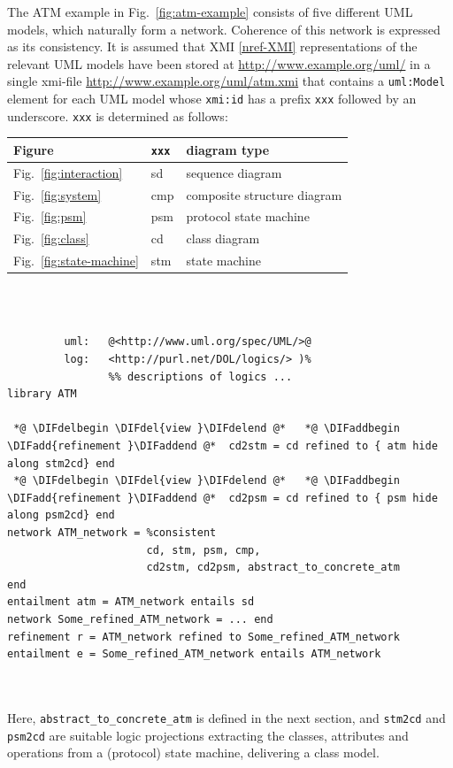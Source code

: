 \documentclass[10pt, a4paper]{isov2}
\newcommand{\bcnew}[1]{~\\{\color{red}\large \hrulefill \href{http://issues.omg.org/browse/DOL-#1}{\normalfont{JIRA DOL-{}#1}} \hrulefill\\}  }
\newcommand{\ecnew}[0]{~\\{{\color{red}\large \hrulefill {\normalfont{end}} \hrulefill\\}  }}
\renewcommand{\noterefname}{note}
\renewcommand{\nref}[1]{\noterefname~\ref{#1}}
\renewcommand{\nref}[1]{\ref{nref-#1}}
\providecommand{\DIFaddtex}[1]{{\protect\color{blue}\uwave{#1}}} %
\providecommand{\DIFdeltex}[1]{{\protect\color{red}\sout{#1}}}                      %
\providecommand{\DIFaddbegin}{} %
\providecommand{\DIFaddend}{} %
\providecommand{\DIFdelbegin}{} %
\providecommand{\DIFdelend}{} %
\providecommand{\DIFadd}[1]{\texorpdfstring{\DIFaddtex{#1}}{#1}} %
\providecommand{\DIFdel}[1]{\texorpdfstring{\DIFdeltex{#1}}{}} %
\begin{document}
The ATM example in Fig.~\ref{fig:atm-example} consists of five different
UML models, which naturally form a network. Coherence of this network is
expressed as its consistency.  It is assumed that XMI \nref{XMI} representations of
the relevant UML models have been stored at
\url{http://www.example.org/uml/} in a single xmi-file \url{http://www.example.org/uml/atm.xmi} that contains a
\texttt{uml:Model} element for each UML model whose \texttt{xmi:id} has
a prefix \texttt{xxx} followed by an underscore. \texttt{xxx} is determined 
as follows:\medskip

\begin{tabular}{|l|l|l|}\hline
\textbf{Figure} & \textbf{\texttt{xxx}} & \textbf{diagram type}\\\hline
Fig.~\ref{fig:interaction} & sd & sequence diagram\\\hline
Fig.~\ref{fig:system} & cmp & composite structure diagram\\\hline
Fig.~\ref{fig:psm} & psm & protocol state machine\\\hline
Fig.~\ref{fig:class} & cd & class diagram\\\hline
Fig.~\ref{fig:state-machine} & stm & state machine\\\hline
\end{tabular}

\bcnew{41}
\begin{lstlisting}[basicstyle=\ttfamily,language=dolText,escapechar=@,mathescape]
%prefix( :      <http://www.example.org/uml/>
         uml:   @<http://www.uml.org/spec/UML/>@
         log:   <http://purl.net/DOL/logics/> )%
                %% descriptions of logics ...
library ATM

 *@ \DIFdelbegin \DIFdel{view }\DIFdelend @*   *@ \DIFaddbegin \DIFadd{refinement }\DIFaddend @*  cd2stm = cd refined to { atm hide along stm2cd} end
 *@ \DIFdelbegin \DIFdel{view }\DIFdelend @*   *@ \DIFaddbegin \DIFadd{refinement }\DIFaddend @*  cd2psm = cd refined to { psm hide along psm2cd} end
network ATM_network = %consistent
                      cd, stm, psm, cmp,
                      cd2stm, cd2psm, abstract_to_concrete_atm
end
entailment atm = ATM_network entails sd
network Some_refined_ATM_network = ... end
refinement r = ATM_network refined to Some_refined_ATM_network
entailment e = Some_refined_ATM_network entails ATM_network
\end{lstlisting}
\ecnew
Here, \texttt{abstract\_to\_concrete\_atm} is defined in the next
section, and \texttt{stm2cd} and \texttt{psm2cd} are suitable logic
projections extracting the classes, attributes and operations from a
(protocol) state machine, delivering a class model.
\end{document}
